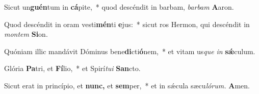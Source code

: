 \item Sicut un\textbf{guén}tum in \textbf{cá}pite,~* quod descéndit in barbam, \textit{barbam} \textbf{A}aron.
\item Quod descéndit in oram vesti\textbf{mén}ti \textbf{e}jus:~* sicut ros Hermon, qui descéndit in \textit{montem} \textbf{Si}on.
\item Quóniam illic mandávit Dóminus bene\textbf{di}cti\textbf{ó}nem,~* et vitam us\hspace{0.02em}\textit{que} \textit{in} \textbf{sǽ}culum.
\item Glória \textbf{Pa}tri, et \textbf{Fí}lio,~* et Spirí\hspace{0.03em}\textit{tui} \textbf{San}cto.
\item Sicut erat in princípio, et \textbf{nunc,} et \textbf{sem}per,~* et in sǽcula sæcu\hspace{0.03em}\textit{lórum.} \textbf{A}men.